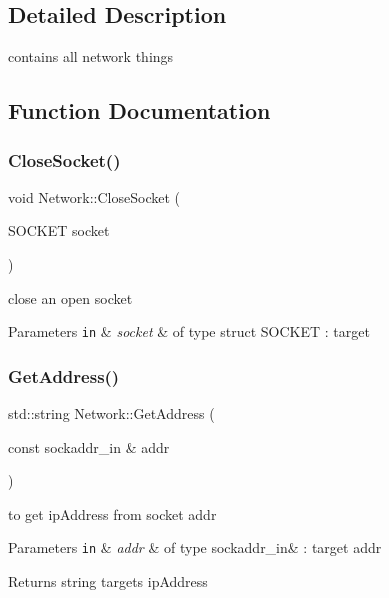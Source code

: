 \subsection{Detailed Description}
contains all network things 

\subsection{Function Documentation}
\mbox{\label{namespace_network_a709c320df831b3a900af6ae1c8849b00}} 
\subsubsection{\texorpdfstring{Close\+Socket()}{CloseSocket()}}
{\footnotesize\ttfamily void Network\+::\+Close\+Socket (\begin{DoxyParamCaption}\item[{S\+O\+C\+K\+ET}]{socket }\end{DoxyParamCaption})}



close an open socket 


\begin{DoxyParams}[1]{Parameters}
\mbox{\tt in}  & {\em socket} & of type struct S\+O\+C\+K\+ET \+: target \\
\hline
\end{DoxyParams}
\mbox{\label{namespace_network_a0b77e5f397e6738b7e68d51cf0d3e46a}} 
\subsubsection{\texorpdfstring{Get\+Address()}{GetAddress()}}
{\footnotesize\ttfamily std\+::string Network\+::\+Get\+Address (\begin{DoxyParamCaption}\item[{const sockaddr\+\_\+in \&}]{addr }\end{DoxyParamCaption})}



to get ip\+Address from socket addr 


\begin{DoxyParams}[1]{Parameters}
\mbox{\tt in}  & {\em addr} & of type sockaddr\+\_\+in\& \+: target addr\\
\hline
\end{DoxyParams}
\begin{DoxyReturn}{Returns}
string target\textquotesingle{}s ip\+Address 
\end{DoxyReturn}
\mbox{\label{namespace_network_a907c6a68c883d4e7b8d12df59b107a4e}} 

